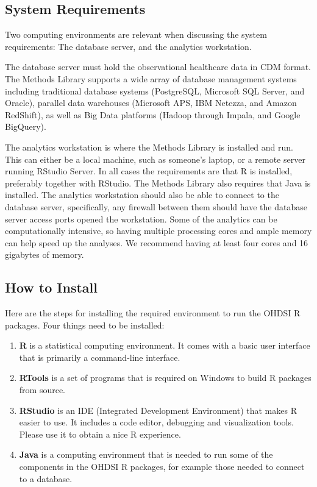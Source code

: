 \documentclass[11pt]{book}
\providecommand{\tightlist}{%
  \setlength{\itemsep}{0pt}\setlength{\parskip}{0pt}}
\theoremstyle{definition}
\theoremstyle{definition}
\theoremstyle{definition}
\theoremstyle{remark}
\begin{document}
\subsection{System Requirements}\label{system-requirements}

Two computing environments are relevant when discussing the system
requirements: The database server, and the analytics workstation.

The database server must hold the observational healthcare data in CDM
format. The Methods Library supports a wide array of database management
systems including traditional database systems (PostgreSQL, Microsoft
SQL Server, and Oracle), parallel data warehouses (Microsoft APS, IBM
Netezza, and Amazon RedShift), as well as Big Data platforms (Hadoop
through Impala, and Google BigQuery).

The analytics workstation is where the Methods Library is installed and
run. This can either be a local machine, such as someone's laptop, or a
remote server running RStudio Server. In all cases the requirements are
that R is installed, preferably together with RStudio. The Methods
Library also requires that Java is installed. The analytics workstation
should also be able to connect to the database server, specifically, any
firewall between them should have the database server access ports
opened the workstation. Some of the analytics can be computationally
intensive, so having multiple processing cores and ample memory can help
speed up the analyses. We recommend having at least four cores and 16
gigabytes of memory.

\subsection{How to Install}\label{installR}

Here are the steps for installing the required environment to run the
OHDSI R packages. Four things need to be installed:

\begin{enumerate}
\def\labelenumi{\arabic{enumi}.}
\tightlist
\item
  \textbf{R} is a statistical computing environment. It comes with a
  basic user interface that is primarily a command-line interface.
\item
  \textbf{RTools} is a set of programs that is required on Windows to
  build R packages from source.
\item
  \textbf{RStudio} is an IDE (Integrated Development Environment) that
  makes R easier to use. It includes a code editor, debugging and
  visualization tools. Please use it to obtain a nice R experience.
\item
  \textbf{Java} is a computing environment that is needed to run some of
  the components in the OHDSI R packages, for example those needed to
  connect to a database.
\end{enumerate}
\end{document}
